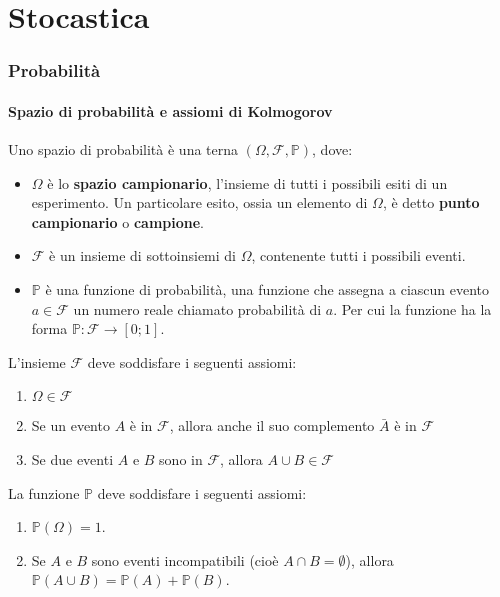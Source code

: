 \documentclass{article}
\begin{document}
\newpage
\part{Stocastica}

\section{Probabilità}

\subsection{Spazio di probabilità e assiomi di Kolmogorov}
Uno spazio di probabilità è una terna \((\Omega, \mathcal{F}, \mathbb{P})\), dove:
\begin{itemize}
    \item \(\Omega\) è lo \textbf{spazio campionario}, l'insieme di tutti i possibili esiti di
        un esperimento. Un particolare esito, ossia un elemento di \(\Omega\), è detto
        \textbf{punto campionario} o \textbf{campione}.
    \item \(\mathcal{F}\) è un insieme di sottoinsiemi di \(\Omega\), contenente tutti i
        possibili eventi.

    \item \(\mathbb{P}\) è una funzione di probabilità, una funzione che assegna a ciascun
        evento \(a \in \mathcal{F}\) un numero reale chiamato probabilità di \(a\). Per cui la
        funzione ha la forma \(\mathbb{P} \colon \mathcal{F} \to [0;1]\).
\end{itemize}
L'insieme \(\mathcal{F}\) deve soddisfare i seguenti assiomi:
\begin{enumerate}
    \item \(\Omega \in \mathcal{F}\)
    \item Se un evento \(A\) è in \(\mathcal{F}\), allora anche il suo complemento \(\bar{A}\) è in \(\mathcal{F}\)
    \item Se due eventi \(A\) e \(B\) sono in \(\mathcal{F}\), allora \(A \cup B \in \mathcal{F}\)
\end{enumerate}
La funzione \(\mathbb{P}\) deve soddisfare i seguenti assiomi:
\begin{enumerate}
    \item \(\mathbb{P}(\Omega) = 1\).
    \item Se \(A\) e \(B\) sono eventi incompatibili (cioè \(A \cap B = \emptyset\)), allora \(\mathbb{P}(A \cup B) = \mathbb{P}(A) + \mathbb{P}(B)\).
\end{enumerate}
\end{document}
